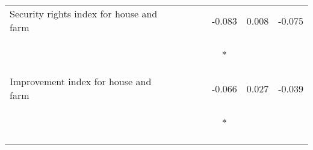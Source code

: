 \begin{tabular}{lcccccc}
\noalign{\smallskip}Security rights index for house and farm &  &  &  & -0.083 & 0.008 & -0.075\\
 & \begin{footnotesize}\end{footnotesize} & \begin{footnotesize}\end{footnotesize} & \begin{footnotesize}\end{footnotesize} & \begin{footnotesize}[0.044]*\end{footnotesize} & \begin{footnotesize}[0.064]\end{footnotesize} & \begin{footnotesize}[0.054]\end{footnotesize}\\
\noalign{\smallskip}Improvement index for house and farm &  &  &  & -0.066 & 0.027 & -0.039\\
 & \begin{footnotesize}\end{footnotesize} & \begin{footnotesize}\end{footnotesize} & \begin{footnotesize}\end{footnotesize} & \begin{footnotesize}[0.039]*\end{footnotesize} & \begin{footnotesize}[0.061]\end{footnotesize} & \begin{footnotesize}[0.056]\end{footnotesize}\\
\noalign{\smallskip}\hline\end{tabular}
